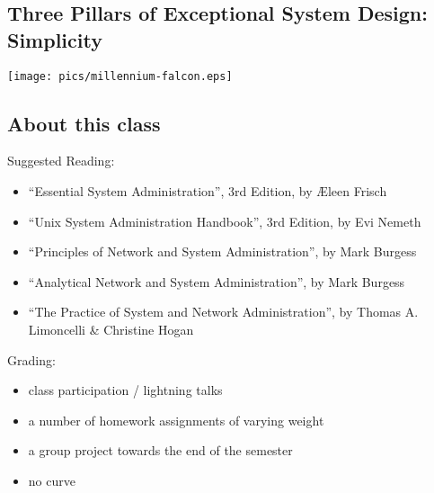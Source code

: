 \documentclass[xga]{xdvislides}
\begin{document}
\subsection{Three Pillars of Exceptional System Design: Simplicity}
\vspace*{\fill}
\begin{center}
    \texttt{[image: pics/millennium-falcon.eps]} \\
\end{center}
\vspace*{\fill}







\subsection{About this class}
Suggested Reading:
\begin{itemize}
	\item ``Essential System Administration'', 3rd Edition, by \AE leen
		Frisch
	\item ``Unix System Administration Handbook'', 3rd Edition, by Evi Nemeth
	\item ``Principles of Network and System Administration'', by Mark Burgess
	\item ``Analytical Network and System Administration'', by Mark Burgess
	\item ``The Practice of System and Network Administration'', by Thomas
		A. Limoncelli \& Christine Hogan
\end{itemize}
\addvspace{.5in}
Grading:
\begin{itemize}
	\item class participation / lightning talks
	\item a number of homework assignments of varying weight
	\item a group project towards the end of the semester
	\item no curve
\end{itemize}
\end{document}
